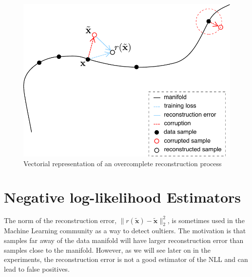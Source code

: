 \begin{figure}[!h]
\centering
\includegraphics[scale=0.55]{figures/reconstruction-denoising}
\caption[Vectorial representation of overcomplete AE]{Vectorial representation of an overcomplete reconstruction process}
\label{fig:reconstruction-dae}
\end{figure}


\section{Negative log-likelihood Estimators}

The norm of the reconstruction error, $\lVert r(\tilde{\mathbf{x}}) - \tilde{\mathbf{x}} \rVert_2^2$, is sometimes used in the Machine Learning community as a way to detect oultiers. The motivation is that samples far away of the data manifold will have larger reconstruction error than samples close to the manifold. However, as we will see later on in the experiments, the reconstruction error is not a good estimator of the NLL and can lead to false positives.

